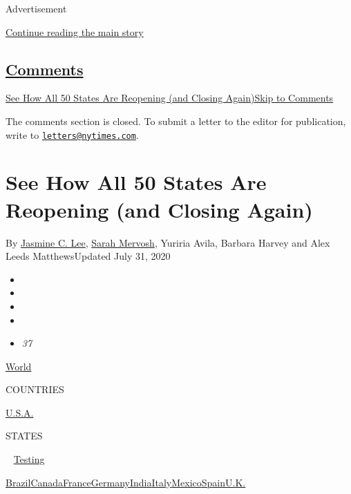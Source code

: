 Advertisement

\protect\hyperlink{after-top}{Continue reading the main story}

\hypertarget{comments}{%
\subsection{\texorpdfstring{\protect\hyperlink{commentsContainer}{Comments}}{Comments}}\label{comments}}

\href{}{See How All 50 States Are Reopening (and Closing
Again)}\href{}{Skip to Comments}

The comments section is closed. To submit a letter to the editor for
publication, write to
\href{mailto:letters@nytimes.com}{\nolinkurl{letters@nytimes.com}}.

\hypertarget{see-how-all-50-states-are-reopening-and-closing-again}{%
\section{See How All 50 States Are Reopening (and Closing
Again)}\label{see-how-all-50-states-are-reopening-and-closing-again}}

By \href{https://www.nytimes.com/by/jasmine-c-lee}{Jasmine C. Lee},
\href{https://www.nytimes.com/by/sarah-mervosh}{Sarah Mervosh}, Yuriria
Avila, Barbara Harvey and Alex Leeds MatthewsUpdated July 31, 2020

\begin{itemize}
\item
\item
\item
\item
\item
  \emph{37}
\end{itemize}

\href{https://www.nytimes.com/interactive/2020/world/coronavirus-maps.html}{World}~

COUNTRIES

\textbar{}
\href{https://www.nytimes.com/interactive/2020/us/coronavirus-us-cases.html}{U.S.A.}~

STATES

~
\href{https://www.nytimes.com/interactive/2020/us/coronavirus-testing.html}{Testing}

\href{https://www.nytimes.com/interactive/2020/world/americas/brazil-coronavirus-cases.html}{Brazil}\href{https://www.nytimes.com/interactive/2020/world/canada/canada-coronavirus-cases.html}{Canada}\href{https://www.nytimes.com/interactive/2020/world/europe/france-coronavirus-cases.html}{France}\href{https://www.nytimes.com/interactive/2020/world/europe/germany-coronavirus-cases.html}{Germany}\href{https://www.nytimes.com/interactive/2020/world/asia/india-coronavirus-cases.html}{India}\href{https://www.nytimes.com/interactive/2020/world/europe/italy-coronavirus-cases.html}{Italy}\href{https://www.nytimes.com/interactive/2020/world/americas/mexico-coronavirus-cases.html}{Mexico}\href{https://www.nytimes.com/interactive/2020/world/europe/spain-coronavirus-cases.html}{Spain}\href{https://www.nytimes.com/interactive/2020/world/europe/united-kingdom-coronavirus-cases.html}{U.K.}

